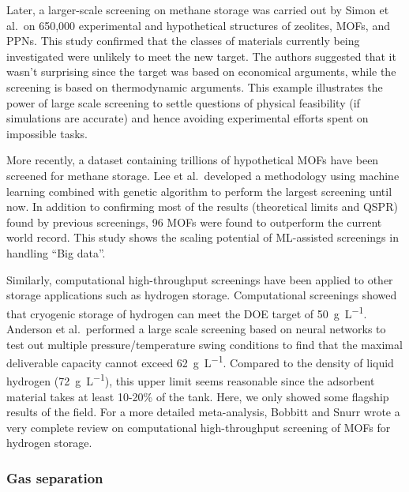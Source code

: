 \documentclass[main.tex]{subfiles}
\begin{document}
Later, a larger-scale screening on methane storage was carried out by Simon et al.\ on 650,000 experimental and hypothetical structures of zeolites, MOFs, and PPNs. This study confirmed that the classes of materials currently being investigated were unlikely to meet the new target. The authors suggested that it wasn't surprising since the target was based on economical arguments, while the screening is based on thermodynamic arguments.\cite{Simon_2015_EES} This example illustrates the power of large scale screening to settle questions of physical feasibility (if simulations are accurate) and hence avoiding experimental efforts spent on impossible tasks.

More recently, a dataset containing trillions of hypothetical MOFs have been screened for methane storage.\cite{Lee_2021} Lee et al.\ developed a methodology using machine learning combined with genetic algorithm to perform the largest screening until now. In addition to confirming most of the results (theoretical limits and QSPR) found by previous screenings, 96 MOFs were found to outperform the current world record. This study shows the scaling potential of ML-assisted screenings in handling ``Big data''.

Similarly, computational high-throughput screenings have been applied to other storage applications such as hydrogen storage. Computational screenings showed that cryogenic storage of hydrogen can meet the DOE target of \SI{50}{\gram\per\liter}.\cite{Gomez_Gualdron_2016, Bobbitt_2016, Thornton_2017} Anderson et al.\ performed a large scale screening based on neural networks to test out multiple pressure/temperature swing conditions to find that the maximal deliverable capacity cannot exceed \SI{62}{\gram\per\liter}.\cite{Anderson_2018} Compared to the density of liquid hydrogen (\SI{72}{\gram\per\liter}), this upper limit seems reasonable since the adsorbent material takes at least {10-20\%} of the tank. Here, we only showed some flagship results of the field. For a more detailed meta-analysis, Bobbitt and Snurr wrote a very complete review on computational high-throughput screening of MOFs for hydrogen storage.\cite{Bobbitt_2019}

\subsubsection{Gas separation}
\end{document}
